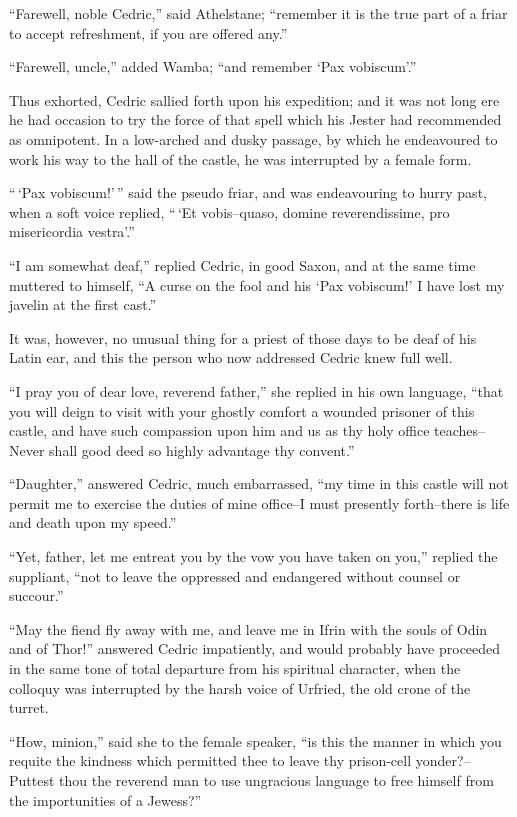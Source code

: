 ``Farewell, noble Cedric,'' said Athelstane; ``remember it is the true
part of a friar to accept refreshment, if you are offered any.''

``Farewell, uncle,'' added Wamba; ``and remember `Pax vobiscum'.''

Thus exhorted, Cedric sallied forth upon his expedition; and it was not
long ere he had occasion to try the force of that spell which his Jester
had recommended as omnipotent. In a low-arched and dusky passage, by
which he endeavoured to work his way to the hall of the castle, he was
interrupted by a female form.

``\,`Pax vobiscum!'\,'' said the pseudo friar, and was endeavouring to
hurry past, when a soft voice replied, ``\,`Et vobis--quaso, domine
reverendissime, pro misericordia vestra'.''

``I am somewhat deaf,'' replied Cedric, in good Saxon, and at the same
time muttered to himself, ``A curse on the fool and his `Pax vobiscum!'
I have lost my javelin at the first cast.''

It was, however, no unusual thing for a priest of those days to be deaf
of his Latin ear, and this the person who now addressed Cedric knew full
well.

``I pray you of dear love, reverend father,'' she replied in his own
language, ``that you will deign to visit with your ghostly comfort a
wounded prisoner of this castle, and have such compassion upon him and
us as thy holy office teaches--Never shall good deed so highly advantage
thy convent.''

``Daughter,'' answered Cedric, much embarrassed, ``my time in this
castle will not permit me to exercise the duties of mine office--I must
presently forth--there is life and death upon my speed.''

``Yet, father, let me entreat you by the vow you have taken on you,''
replied the suppliant, ``not to leave the oppressed and endangered
without counsel or succour.''

``May the fiend fly away with me, and leave me in Ifrin with the souls
of Odin and of Thor!'' answered Cedric impatiently, and would probably
have proceeded in the same tone of total departure from his spiritual
character, when the colloquy was interrupted by the harsh voice of
Urfried, the old crone of the turret.

``How, minion,'' said she to the female speaker, ``is this the manner in
which you requite the kindness which permitted thee to leave thy
prison-cell yonder?--Puttest thou the reverend man to use ungracious
language to free himself from the importunities of a Jewess?''

